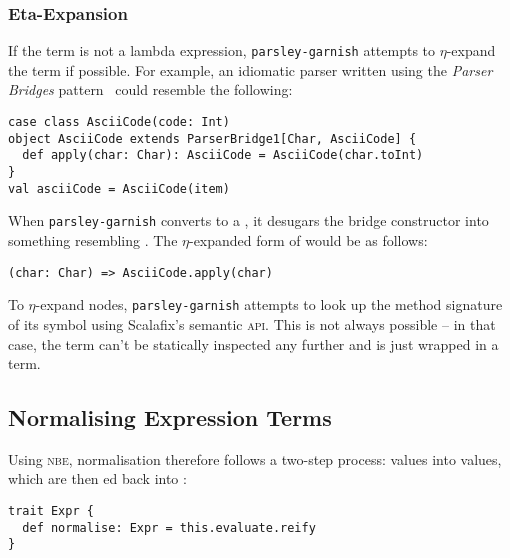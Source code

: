 \documentclass[../../../main.tex]{subfiles}
\begin{document}
\subsubsection{Eta-Expansion}
If the term is not a lambda expression, \texttt{parsley-garnish} attempts to $\eta$-expand the term if possible.
For example, an idiomatic parser written using the \emph{Parser Bridges} pattern~\cite{willis_design_2022} could resemble the following:
\begin{verbatim}
case class AsciiCode(code: Int)
object AsciiCode extends ParserBridge1[Char, AsciiCode] {
  def apply(char: Char): AsciiCode = AsciiCode(char.toInt)
}
val asciiCode = AsciiCode(item)
\end{verbatim}
%
When \texttt{parsley-garnish} converts  to a , it desugars the bridge constructor into something resembling .
The $\eta$-expanded form of  would be as follows:
\begin{verbatim}
(char: Char) => AsciiCode.apply(char)
\end{verbatim}
%
To $\eta$-expand  nodes, \texttt{parsley-garnish} attempts to look up the method signature of its symbol using Scalafix's semantic \textsc{api}.
This is not always possible -- in that case, the term can't be statically inspected any further and is just wrapped in a  term.

\subsection{Normalising Expression Terms}
Using \textsc{nbe}, normalisation therefore follows a two-step process:  values  into  values, which are then ed back into :
\begin{verbatim}
trait Expr {
  def normalise: Expr = this.evaluate.reify
}
\end{verbatim}
%
\end{document}

